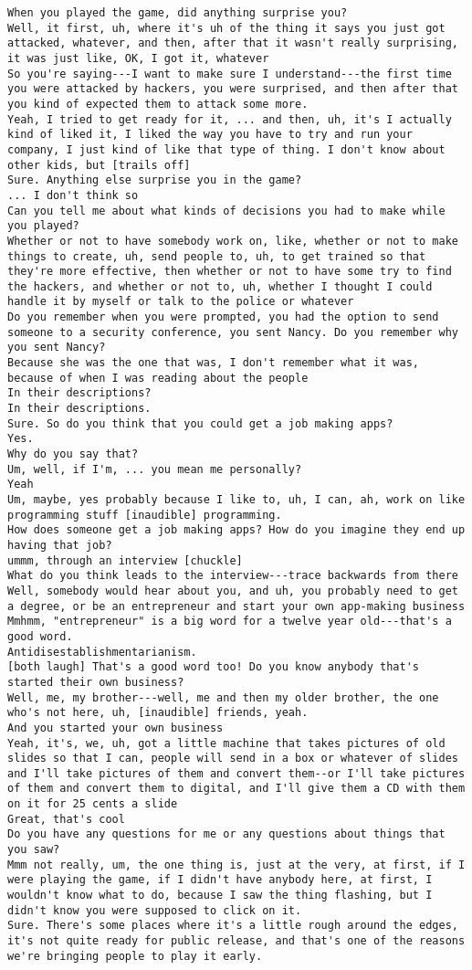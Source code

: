 \begin{lstlisting}
When you played the game, did anything surprise you?
Well, it first, uh, where it's uh of the thing it says you just got attacked, whatever, and then, after that it wasn't really surprising, it was just like, OK, I got it, whatever
So you're saying---I want to make sure I understand---the first time you were attacked by hackers, you were surprised, and then after that you kind of expected them to attack some more.
Yeah, I tried to get ready for it, ... and then, uh, it's I actually kind of liked it, I liked the way you have to try and run your company, I just kind of like that type of thing. I don't know about other kids, but [trails off]
Sure. Anything else surprise you in the game?
... I don't think so
Can you tell me about what kinds of decisions you had to make while you played?
Whether or not to have somebody work on, like, whether or not to make things to create, uh, send people to, uh, to get trained so that they're more effective, then whether or not to have some try to find the hackers, and whether or not to, uh, whether I thought I could handle it by myself or talk to the police or whatever
Do you remember when you were prompted, you had the option to send someone to a security conference, you sent Nancy. Do you remember why you sent Nancy?
Because she was the one that was, I don't remember what it was, because of when I was reading about the people
In their descriptions?
In their descriptions. 
Sure. So do you think that you could get a job making apps?
Yes.
Why do you say that?
Um, well, if I'm, ... you mean me personally?
Yeah
Um, maybe, yes probably because I like to, uh, I can, ah, work on like programming stuff [inaudible] programming.
How does someone get a job making apps? How do you imagine they end up having that job?
ummm, through an interview [chuckle]
What do you think leads to the interview---trace backwards from there
Well, somebody would hear about you, and uh, you probably need to get a degree, or be an entrepreneur and start your own app-making business
Mmhmm, "entrepreneur" is a big word for a twelve year old---that's a good word.
Antidisestablishmentarianism.
[both laugh] That's a good word too! Do you know anybody that's started their own business?
Well, me, my brother---well, me and then my older brother, the one who's not here, uh, [inaudible] friends, yeah.
And you started your own business
Yeah, it's, we, uh, got a little machine that takes pictures of old slides so that I can, people will send in a box or whatever of slides and I'll take pictures of them and convert them--or I'll take pictures of them and convert them to digital, and I'll give them a CD with them on it for 25 cents a slide
Great, that's cool
Do you have any questions for me or any questions about things that you saw?
Mmm not really, um, the one thing is, just at the very, at first, if I were playing the game, if I didn't have anybody here, at first, I wouldn't know what to do, because I saw the thing flashing, but I didn't know you were supposed to click on it.
Sure. There's some places where it's a little rough around the edges, it's not quite ready for public release, and that's one of the reasons we're bringing people to play it early.
\end{lstlisting}

